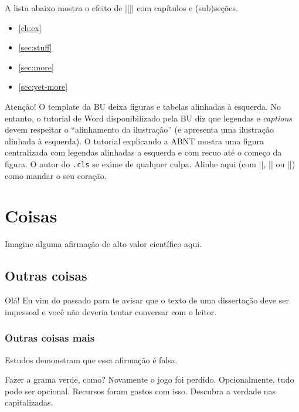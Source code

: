 \documentclass[embeddedlogo]{../ufsc-thesis-rn46-2019}
\begin{document}
A lista abaixo mostra o efeito de \mt|\autoref{}| com capítulos e (sub)seções.

\begin{itemize}
\item \autoref{ch:ex}
\item \autoref{sec:stuff}
\item \autoref{sec:more}
\item \autoref{sec:yet-more}
\end{itemize}

Atenção! O template da BU deixa figuras e tabelas alinhadas à esquerda. No
entanto, o tutorial de Word disponibilizado pela BU diz que legendas e
\emph{captions} devem respeitar o ``alinhamento da ilustração'' (e apresenta
uma ilustração alinhada à esquerda). O tutorial explicando a ABNT mostra uma
figura centralizada com legendas alinhadas a esquerda e com recuo até o começo
da figura. O autor do \texttt{.cls} se exime de qualquer culpa. Alinhe aqui
(com \mt|\centering|, \mt|\flushright| ou \mt|\flushleft|) como mandar o seu
coração.

\section{Coisas}
\label{sec:stuff}
Imagine alguma afirmação de alto valor científico aqui.

\subsection{Outras coisas}
\label{sec:more}
Olá! Eu vim do passado para te avisar que o texto de uma dissertação deve ser
impessoal e você não deveria tentar conversar com o leitor.

\subsubsection{Outras coisas mais}
\label{sec:yet-more}
Estudos demonstram que essa afirmação é falsa.

\label{sec:yet-another}
Fazer a grama verde, como? Novamente o jogo foi perdido. Opcionalmente, tudo
pode ser opcional. Recursos foram gastos com isso. Descubra a verdade nas
capitalizadas.


\postextual

\end{document}
